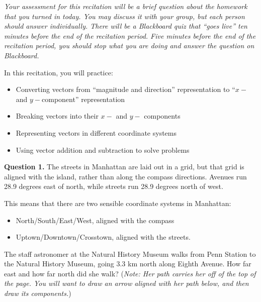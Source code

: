 \documentclass[12pt]{article}
\newcommand{\BI}{\begin{itemize}}
\newcommand{\EI}{\end{itemize}}
\def\BS{\bigskip}
\begin{document}
\Large
\centerline{}
\normalsize
\centerline{}

\it Your assessment for this recitation will be a brief question about the homework that you turned in today. You may discuss it with your group, but each person should answer individually. There will be a Blackboard quiz that ``goes live'' ten minutes before the end of the recitation period. Five minutes before the end of the recitation period, you should stop what you are doing and answer the question on Blackboard.

\rmfamily

\medskip

\rm In this recitation, you will practice:

\BI
\item Converting vectors from ``magnitude and direction'' representation to ``$x-$ and $y-$component'' representation
\item Breaking vectors into their $x-$ and $y-$ components
\item Representing vectors in different coordinate systems
\item Using vector addition and subtraction to solve problems
\EI
\newpage
\begin{minipage}{0.45\textwidth}
{\bf Question 1.} The streets in Manhattan are laid out in a grid, but that grid is aligned with the island, rather than along the compass directions. Avenues run 28.9 degrees east of north, while streets run 28.9 degrees north of west. 

This means that there are two sensible coordinate systems in Manhattan:

\BI
\item North/South/East/West, aligned with the compass
\item Uptown/Downtown/Crosstown, aligned with the streets.
\EI


\BS\BS

The staff astronomer at the Natural History Museum walks from Penn Station to the Natural History Museum, going 3.3 km north along Eighth Avenue. How far east and how far north did she walk? ({\it Note: Her path carries her off of the top of the page. You will want to draw an arrow aligned with her path below, and then draw its components.})

\vspace{3in}

\end{minipage}
\hspace{0.05\textwidth}
\end{document}
